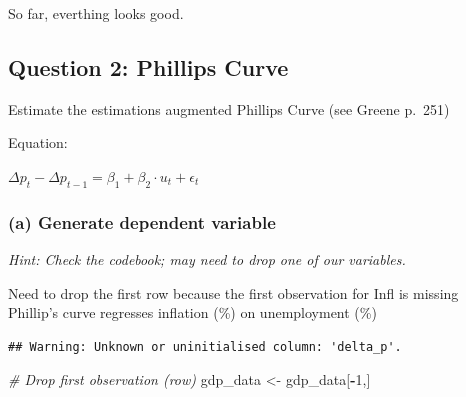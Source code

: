 \documentclass[11pt,]{article}
\newenvironment{Shaded}{\begin{snugshade}}{\end{snugshade}}
\newcommand{\KeywordTok}[1]{\textcolor[rgb]{0.13,0.29,0.53}{\textbf{#1}}}
\newcommand{\DecValTok}[1]{\textcolor[rgb]{0.00,0.00,0.81}{#1}}
\newcommand{\StringTok}[1]{\textcolor[rgb]{0.31,0.60,0.02}{#1}}
\newcommand{\CommentTok}[1]{\textcolor[rgb]{0.56,0.35,0.01}{\textit{#1}}}
\newcommand{\OtherTok}[1]{\textcolor[rgb]{0.56,0.35,0.01}{#1}}
\newcommand{\ControlFlowTok}[1]{\textcolor[rgb]{0.13,0.29,0.53}{\textbf{#1}}}
\newcommand{\OperatorTok}[1]{\textcolor[rgb]{0.81,0.36,0.00}{\textbf{#1}}}
\newcommand{\NormalTok}[1]{#1}
\begin{document}
So far, everthing looks good.

\subsection{Question 2: Phillips Curve}\label{question-2-phillips-curve}

Estimate the estimations augmented Phillips Curve (see Greene p.~251)

Equation:

\(\Delta p_t - \Delta p_{t-1} = \beta_1 + \beta_2\cdot u_t + \epsilon_t\)

\subsubsection{(a) Generate dependent
variable}\label{a-generate-dependent-variable}

\emph{Hint: Check the codebook; may need to drop one of our variables.}

Need to drop the first row because the first observation for Infl is
missing Phillip's curve regresses inflation (\%) on unemployment (\%)

\begin{Shaded}
\end{Shaded}

\begin{verbatim}
## Warning: Unknown or uninitialised column: 'delta_p'.
\end{verbatim}

\begin{Shaded}
\begin{Highlighting}[]
\CommentTok{# Drop first observation (row)}
\NormalTok{gdp_data <-}\StringTok{ }\NormalTok{gdp_data[}\OperatorTok{-}\DecValTok{1}\NormalTok{,]}
\end{Highlighting}
\end{Shaded}
\end{document}
